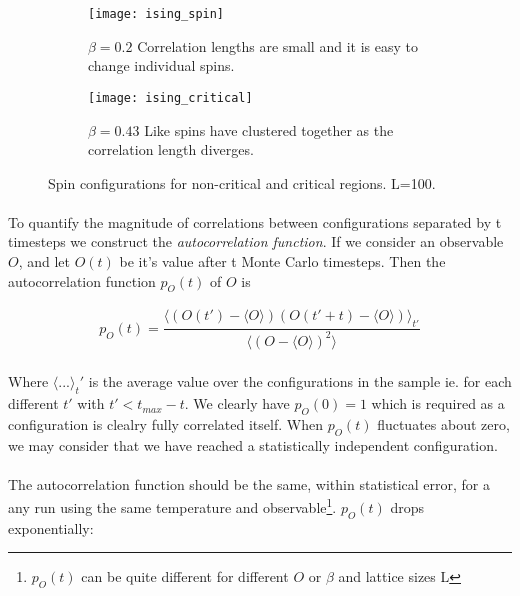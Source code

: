 \documentclass[12pt] {report} %
\begin{document}
			\begin{figure}[H]
				\centering
			\hspace*{\fill}
			\begin{subfigure}[h]{0.35\textwidth}
				\centering
				\texttt{[image: ising\_spin]}
				\caption{$\beta = 0.2$ Correlation lengths are small and it is easy to change individual spins.}
				\label{fig:non_critical_spin}
			\end{subfigure}
			\hfill	
			\begin{subfigure}[h]{0.35\textwidth}
				\centering
				\texttt{[image: ising\_critical]}
				\caption{$\beta = 0.43$ Like spins have clustered together as the correlation length diverges.}
				\label{fig:critical_spin}
			\end{subfigure}
			\hspace*{\fill}
				\caption{Spin configurations for non-critical and critical regions. L=100.}
				\label{fig:spin_configurations}
			\end{figure}
			
			\paragraph{}
				To quantify the magnitude of correlations between configurations separated by t timesteps we construct the \textit{autocorrelation function}. If we consider an observable $O$, and let $O(t)$ be it's value after t Monte Carlo timesteps. Then the autocorrelation function $p_O(t)$ of $O$ is
				
			\begin{align}
				p_O(t) = \dfrac{\langle (O(t') - \langle O \rangle) (O(t'+t)-\langle O \rangle) \rangle_{t'}}{\langle (O -  \langle O \rangle)^2\rangle} 	\label{eq:autocorrelation_function}
			\end{align}	
			
			\paragraph{}
				Where $\langle ... \rangle_t'$ is the average value over the configurations in the sample ie. for each different $t'$ with $t' < t_{max} - t$. We clearly have $p_O(0) = 1$ which is required as a configuration is clealry fully correlated itself. When $p_O(t)$ fluctuates about zero, we may consider that we have reached a statistically independent configuration.
				
			\paragraph{}
				The autocorrelation function should be the same, within statistical error, for a any run using the same temperature and observable\footnote{$p_O(t)$ can be quite different for different $O$ or $\beta$ and lattice sizes L}. $p_O(t)$ drops exponentially:
				
\end{document}
